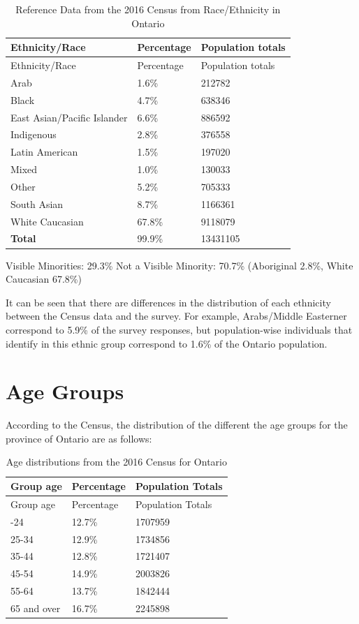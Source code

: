 \documentclass[
  letterpaper,
  DIV=11,
  numbers=noendperiod]{scrartcl}
\begin{document}
\hypertarget{tbl-races}{}
\begin{longtable}[]{@{}lll@{}}
\caption{\label{tbl-races}Reference Data from the 2016 Census from
Race/Ethnicity in Ontario}\tabularnewline
\toprule\noalign{}
Ethnicity/Race & Percentage & Population totals \\
\midrule\noalign{}
\endfirsthead
\toprule\noalign{}
Ethnicity/Race & Percentage & Population totals \\
\midrule\noalign{}
\endhead
\bottomrule\noalign{}
\endlastfoot
Arab & 1.6\% & 212782 \\
Black & 4.7\% & 638346 \\
East Asian/Pacific Islander & 6.6\% & 886592 \\
Indigenous & 2.8\% & 376558 \\
Latin American & 1.5\% & 197020 \\
Mixed & 1.0\% & 130033 \\
Other & 5.2\% & 705333 \\
South Asian & 8.7\% & 1166361 \\
White Caucasian & 67.8\% & 9118079 \\
\textbf{Total} & 99.9\% & 13431105 \\
\end{longtable}

Visible Minorities: 29.3\% Not a Visible Minority: 70.7\% (Aboriginal
2.8\%, White Caucasian 67.8\%)

It can be seen that there are differences in the distribution of each
ethnicity between the Census data and the survey. For example,
Arabs/Middle Easterner correspond to 5.9\% of the survey responses, but
population-wise individuals that identify in this ethnic group
correspond to 1.6\% of the Ontario population.

\hypertarget{age-groups}{%
\section{Age Groups}\label{age-groups}}

According to the Census, the distribution of the different the age
groups for the province of Ontario are as follows:

\begin{longtable}[]{@{}lll@{}}
\caption{Age distributions from the 2016 Census for
Ontario}\tabularnewline
\toprule\noalign{}
Group age & Percentage & Population Totals \\
\midrule\noalign{}
\endfirsthead
\toprule\noalign{}
Group age & Percentage & Population Totals \\
\midrule\noalign{}
\endhead
\bottomrule\noalign{}
\endlastfoot
15-24 & 12.7\% & 1707959 \\
25-34 & 12.9\% & 1734856 \\
35-44 & 12.8\% & 1721407 \\
45-54 & 14.9\% & 2003826 \\
55-64 & 13.7\% & 1842444 \\
65 and over & 16.7\% & 2245898 \\
\end{longtable}
\end{document}
